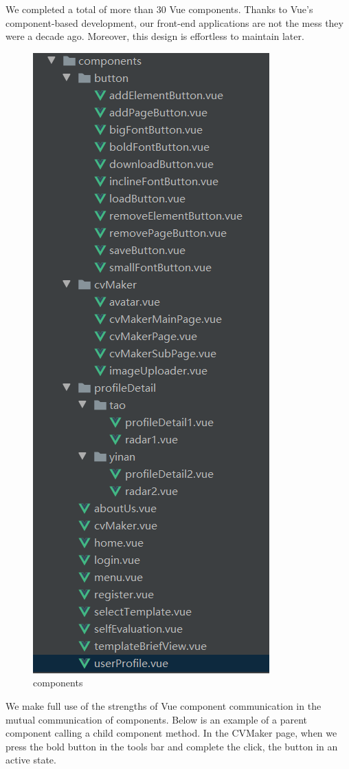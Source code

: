 \documentclass[11pt]{article}
\begin{document}
\begin{spacing}{1.0}
	We completed a total of more than 30 Vue components. Thanks to Vue's component-based development, our front-end applications are not the mess they were a decade ago. Moreover, this design is effortless to maintain later.
	\begin{figure}[H]
		\centering
		\includegraphics[scale=.5]{figures/components.png}
		\caption{components}
		\label{fig:7}
	\end{figure}

We make full use of the strengths of Vue component communication in the mutual communication of components. Below is an example of a parent component calling a child component method. In the CVMaker page, when we press the bold button in the tools bar and complete the click, the button in an active state.


\end{spacing}
\end{document}
